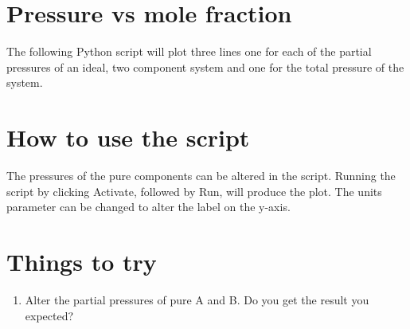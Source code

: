 \documentclass{article}
\begin{document}
\section{Pressure vs mole fraction}

The following Python script will plot three lines one for each of the partial pressures of an ideal, two component system and one for the total pressure of the system.

\section{How to use the script}
The pressures of the pure components can be altered in the script. Running the script by clicking Activate, followed by Run, will produce the plot. The units parameter can be changed to alter the label on the y-axis.

\section{Things to try}
\begin{enumerate}
\item Alter the partial pressures of pure A and B. Do you get the result you expected?
\end{enumerate}
\end{document}
